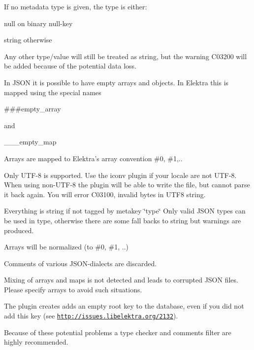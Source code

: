 If no metadata {\ttfamily type} is given, the type is either\+:


\begin{DoxyItemize}
\item {\ttfamily null} on binary null-\/key
\item {\ttfamily string} otherwise
\end{DoxyItemize}

Any other type/value will still be treated as string, but the warning {\ttfamily C03200} will be added because of the potential data loss.

In J\+S\+ON it is possible to have empty arrays and objects. In Elektra this is mapped using the special names


\begin{DoxyCode}
###empty\_array
\end{DoxyCode}


and


\begin{DoxyCode}
\_\_\_empty\_map
\end{DoxyCode}


Arrays are mapped to Elektra’s array convention \#0, \#1,..


\begin{DoxyItemize}
\item Only U\+T\+F-\/8 is supported. Use the {\ttfamily iconv} plugin if your locale are not U\+T\+F-\/8. When using non-\/\+U\+T\+F-\/8 the plugin will be able to write the file, but cannot parse it back again. You will error C03100, invalid bytes in U\+T\+F8 string.
\item Everything is string if not tagged by metakey \char`\"{}type\char`\"{} Only valid J\+S\+ON types can be used in type, otherwise there are some fall backs to string but warnings are produced.
\item Arrays will be normalized (to \#0, \#1, ..)
\item Comments of various J\+S\+O\+N-\/dialects are discarded.
\item Mixing of arrays and maps is not detected and leads to corrupted J\+S\+ON files. Please specify arrays to avoid such situations.
\item The plugin creates adds an empty root key to the database, even if you did not add this key (see \href{http://issues.libelektra.org/2132}{\tt http\+://issues.\+libelektra.\+org/2132}).
\end{DoxyItemize}

Because of these potential problems a type checker and comments filter are highly recommended.


